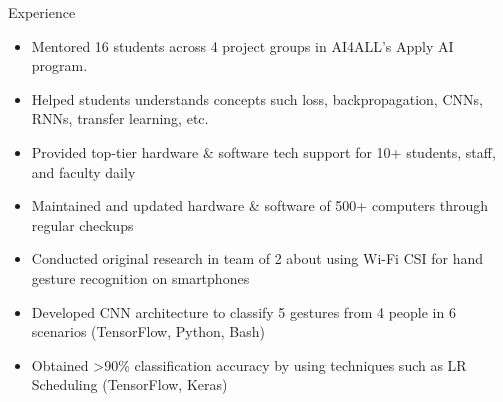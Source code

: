 \documentclass{resume} %
\begin{document}
\begin{workSection}{Experience}
    \experienceItem[
        company=AI4ALL,
        location=Remote,
        position=Student Coordinator,
        duration=August 2023 {-} present
    ]
    \begin{itemize}
        \vspace{-0.5em}
        \itemsep -6pt {}
        \item Mentored 16 students across 4 project groups in AI4ALL's Apply AI program.
        \item Helped students understands concepts such loss, backpropagation, CNNs, RNNs, transfer learning, etc.
    \end{itemize}
    \experienceItem[
        company=UTEP,
        location=El Paso{,} TX,
        position=Computer Lab Assistant,
        duration=January 2023 {-} present
    ]
    \begin{itemize}
        \vspace{-0.5em}
        \itemsep -6pt {}
        \item Provided top-tier hardware \& software tech support for 10+ students, staff, and faculty daily
        \item Maintained and updated hardware \& software of 500+ computers through regular checkups
    \end{itemize}
    \experienceItem[
        company=Temple University,
        location=Philadelphia{,} PA,
        position=Undergraduate Researcher,
        duration=June {-} July 2023
    ]
    \begin{itemize}
        \vspace{-0.5em}
        \itemsep -6pt {}
        \item Conducted original research in team of 2 about using Wi-Fi CSI for hand gesture recognition on smartphones
        \item Developed CNN architecture to classify 5 gestures from 4 people in 6 scenarios (TensorFlow, Python, Bash)
        \item Obtained >90\% classification accuracy by using techniques such as LR Scheduling (TensorFlow, Keras)
    \end{itemize}

\end{workSection}
\end{document}
